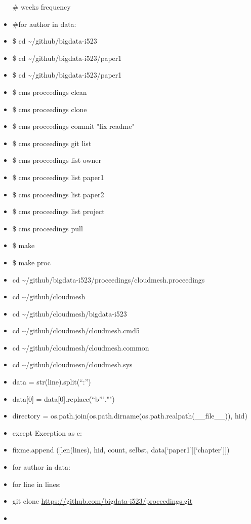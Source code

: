 \begin{itemize}
  \# weeks frequency
\item
  \#for author in data:
\item
  \$ cd \textasciitilde{}/github/bigdata-i523
\item
  \$ cd \textasciitilde{}/github/bigdata-i523/paper1
\item
  \$ cd \textasciitilde{}/github/bigdata-i523/paper1
\item
  \$ cms proceedings clean
\item
  \$ cms proceedings clone
\item
  \$ cms proceedings commit "fix readme"
\item
  \$ cms proceedings git list
\item
  \$ cms proceedings list owner
\item
  \$ cms proceedings list paper1
\item
  \$ cms proceedings list paper2
\item
  \$ cms proceedings list project
\item
  \$ cms proceedings pull
\item
  \$ make
\item
  \$ make proc
\item
  cd
  \textasciitilde{}/github/bigdata-i523/proceedings/cloudmesh.proceedings
\item
  cd \textasciitilde{}/github/cloudmesh
\item
  cd \textasciitilde{}/github/cloudmesh/bigdata-i523
\item
  cd \textasciitilde{}/github/cloudmesh/cloudmesh.cmd5
\item
  cd \textasciitilde{}/github/cloudmesh/cloudmesh.common
\item
  cd \textasciitilde{}/github/cloudmesn/cloudmesh.sys
\item
  data = str(line).split(``:'')
\item
  data{[}0{]} = data{[}0{]}.replace(``b''',"")
\item
  directory =
  os.path.join(os.path.dirname(os.path.realpath(\_\_file\_\_)), hid)
\item
  except Exception as e:
\item
  fixme.append ({[}len(lines), hid, count, selbst,
  data{[}`paper1'{]}{[}`chapter'{]}{]})
\item
  for author in data:
\item
  for line in lines:
\item
  git clone \url{https://github.com/bigdata-i523/proceedings.git}
\item

\end{itemize}
